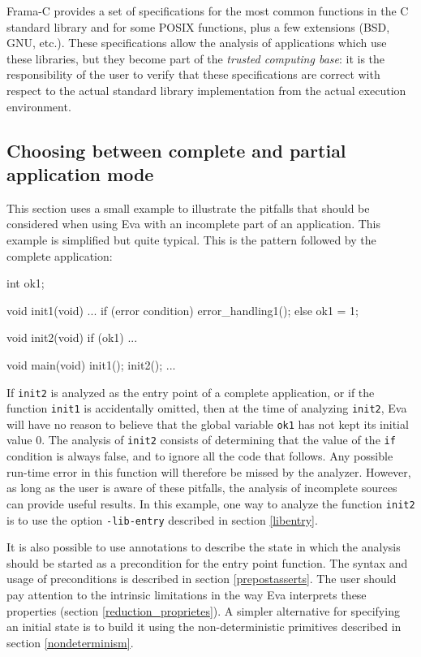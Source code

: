 \documentclass[web]{frama-c-book}
\newcommand{\Eva}{\textsf{Eva}}
\begin{document}
Frama-C provides a set of specifications for the most common functions in the C
standard library and for some POSIX functions, plus a few extensions
(BSD, GNU, etc.). These specifications allow the analysis of applications which
use these libraries, but they become part of the {\em trusted computing base}:
it is the responsibility of the user to verify that these specifications are
correct with respect to the actual standard library implementation from the
actual execution environment.

\subsection{Choosing between complete and partial application mode}

This section uses a small example to illustrate the pitfalls that should
be considered when using \Eva{} with an incomplete
part of an application.
This example is simplified but quite typical. This is the pattern followed
by the complete application:
\begin{listing}{1}
int ok1;

void init1(void) {
  ...
  if (error condition)
    error_handling1();
  else
    ok1 = 1;
}

void init2(void) {
  if (ok1) { ... }
}

void main(void) {
  init1();
  init2();
  ...
}
\end{listing}

If \lstinline|init2| is analyzed as the entry point of a complete application,
or if the function \lstinline|init1| is accidentally omitted, then
at the time of analyzing \lstinline|init2|, \Eva{} will have no reason
to believe that the global variable \lstinline|ok1| has not kept its initial value 0.
The analysis of \lstinline|init2| consists of determining
that the value of the \lstinline|if| condition is always false, and to ignore
all the code that follows. Any possible run-time error in this function 
will therefore be missed by the analyzer.
However, as long as the user is aware of these pitfalls, the analysis of
incomplete sources can provide useful results. In this example, one way
to analyze the function \lstinline|init2| is to use the
option \lstinline|-lib-entry| described in section \ref{libentry}.

It is also possible to use annotations to describe the state in which
the analysis should be started as a precondition for the entry point 
function. The syntax and usage of preconditions is described in
section \ref{prepostasserts}. The user should pay attention to the
intrinsic limitations in the way \Eva{} interprets these
properties (section \ref{reduction_proprietes}). A simpler alternative
for specifying an initial state is to build it
using the non-deterministic
primitives described in section \ref{nondeterminism}.
\end{document}
